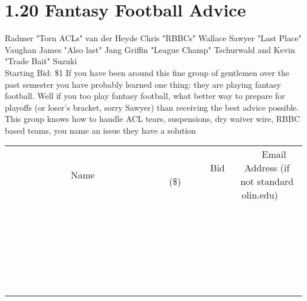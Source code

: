 \documentclass[11pt]{article}
\begin{document}
\section*{1.20 Fantasy Football Advice}
Radmer "Torn ACLs" van der Heyde Chris "RBBCs" Wallace Sawyer "Last Place" Vaughan James "Also last" Jang Griffin "League Champ" Tschurwald and Kevin "Trade Bait" Suzuki
\\
Starting Bid: \$1
\newline
If you have been around this fine group of gentlemen over the past semester you have probably learned one thing: they are playing fantasy football. Well if you too play fantasy football, what better way to prepare for playoffs (or loser's bracket, sorry Sawyer) than receiving the best advice possible. This group knows how to handle ACL tears, suspensions, dry waiver wire, RBBC based teams, you name an issue they have a solution
\\[6ex]
\begin{tabular}{c c c}
~~~~~~~~~~~~~Name~~~~~~~~~~~~~ & ~~~~~~~~~Bid (\$)~~~~~~~~~  & ~~~Email Address (if not standard olin.edu)~~~\\
 & & \\
\hline
 & & \\
\hline
 & & \\
\hline
 & & \\
\hline
 & & \\
\hline
 & & \\
\hline
 & & \\
\hline
 & & \\
\hline
 & & \\
\hline
 & & \\
\hline
 & & \\
\hline
 & & \\
\hline
 & & \\
\hline
 & & \\
\hline
 & & \\
\hline
 & & \\
\hline
 & & \\
\hline
 & & \\
\hline
 & & \\
\hline
 & & \\
\hline
 & & \\
\hline
 & & \\
\hline
 & & \\
\hline
 & & \\
\hline
 & & \\
\hline
 & & \\
\hline
\end{tabular}
\newpage
\end{document}
